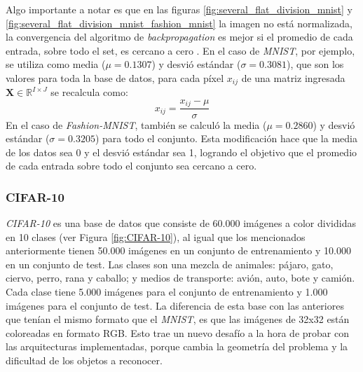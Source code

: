 \documentclass[spanish]{article}
\theoremstyle{definition}
\theoremstyle{remark}
\numberwithin{equation}{section}
\numberwithin{equation}{section} %
\begin{document}
Algo importante a notar es que en las figuras \ref{fig:several_flat_division_mnist} y \ref{fig:several_flat_division_mnist_fashion_mnist} la imagen no está normalizada, la convergencia del algoritmo de \textit{backpropagation} es mejor si el promedio de cada entrada, sobre todo el set, es cercano a cero \cite{lecun2012efficient}. En el caso de \textit{MNIST}, por ejemplo, se utiliza como media ($\mu = 0.1307$) y desvió estándar ($\sigma = 0.3081$), que son los valores para toda la base de datos, para cada píxel $x_{ij}$ de una matriz ingresada $\boldsymbol{X} \in \mathbb{R}^{I \times J}$ se recalcula como:
\begin{equation}
\label{eq_global_contrast_normalization}
x_{ij}=\frac{x_{ij}-\mu}{\sigma}
\end{equation}
En el caso de  \textit{Fashion-MNIST}, también se calculó la media ($\mu = 0.2860$) y desvió estándar ($\sigma = 0.3205$) para todo el conjunto. Esta modificación hace que la media de los datos sea 0 y el desvió estándar sea 1, logrando el objetivo que el promedio de cada entrada sobre todo el conjunto sea cercano a cero.

\subsubsection{CIFAR-10}
\textit{CIFAR-10} \cite{krizhevsky2014cifar} es una base de datos que consiste de 60.000 imágenes a color divididas en 10 clases (ver Figura \ref{fig:CIFAR-10}), al igual que los mencionados anteriormente tienen 50.000 imágenes en un conjunto de entrenamiento y 10.000 en un conjunto de test. Las clases son una mezcla de animales: pájaro, gato, ciervo, perro, rana y caballo; y medios de transporte: avión, auto, bote y camión. Cada clase tiene 5.000 imágenes para el conjunto de entrenamiento y 1.000 imágenes para el conjunto de test. La diferencia de esta base con las anteriores que tenían el mismo formato que el \textit{MNIST}, es que las imágenes de 32x32 están coloreadas en formato RGB. Esto trae un nuevo desafío a la hora de probar con las arquitecturas implementadas, porque cambia la geometría del problema y la dificultad de los objetos a reconocer. \par
\end{document}
